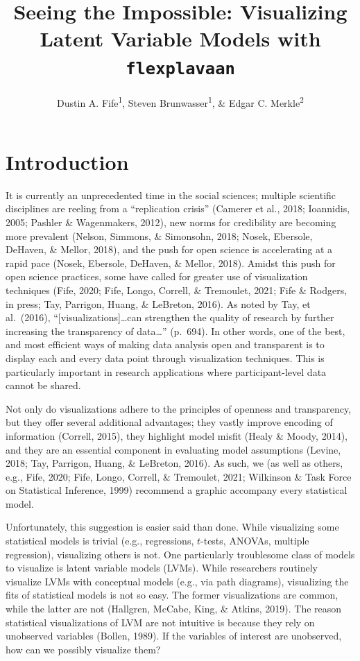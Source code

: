 \documentclass[
  english,
  man]{apa6}
\title{Seeing the Impossible: Visualizing Latent Variable Models with \texttt{flexplavaan}}
\author{Dustin A. Fife\textsuperscript{1}, Steven Brunwasser\textsuperscript{1}, \& Edgar C. Merkle\textsuperscript{2}}
\date{}
\affiliation{\vspace{0.5cm}\textsuperscript{1} Rowan University\\\textsuperscript{2} University of Missouri}
\begin{document}
\maketitle

\hypertarget{introduction}{%
\section{Introduction}\label{introduction}}

It is currently an unprecedented time in the social sciences; multiple scientific disciplines are reeling from a ``replication crisis'' (Camerer et al., 2018; Ioannidis, 2005; Pashler \& Wagenmakers, 2012), new norms for credibility are becoming more prevalent (Nelson, Simmons, \& Simonsohn, 2018; Nosek, Ebersole, DeHaven, \& Mellor, 2018), and the push for open science is accelerating at a rapid pace (Nosek, Ebersole, DeHaven, \& Mellor, 2018). Amidst this push for open science practices, some have called for greater use of visualization techniques (Fife, 2020; Fife, Longo, Correll, \& Tremoulet, 2021; Fife \& Rodgers, in press; Tay, Parrigon, Huang, \& LeBreton, 2016). As noted by Tay, et al.~(2016), ``{[}visualizations{]}\ldots can strengthen the quality of research by further increasing the transparency of data\ldots{}'' (p.~694). In other words, one of the best, and most efficient ways of making data analysis open and transparent is to display each and every data point through visualization techniques. This is particularly important in research applications where participant-level data cannot be shared.

Not only do visualizations adhere to the principles of openness and transparency, but they offer several additional advantages; they vastly improve encoding of information (Correll, 2015), they highlight model misfit (Healy \& Moody, 2014), and they are an essential component in evaluating model assumptions (Levine, 2018; Tay, Parrigon, Huang, \& LeBreton, 2016). As such, we (as well as others, e.g., Fife, 2020; Fife, Longo, Correll, \& Tremoulet, 2021; Wilkinson \& Task Force on Statistical Inference, 1999) recommend a graphic accompany every statistical model.

Unfortunately, this suggestion is easier said than done. While visualizing some statistical models is trivial (e.g., regressions, \(t\)-tests, ANOVAs, multiple regression), visualizing others is not. One particularly troublesome class of models to visualize is latent variable models (LVMs). While researchers routinely visualize LVMs with conceptual models (e.g., via path diagrams), visualizing the fits of statistical models is not so easy. The former visualizations are common, while the latter are not (Hallgren, McCabe, King, \& Atkins, 2019). The reason statistical visualizations of LVM are not intuitive is because they rely on unobserved variables (Bollen, 1989). If the variables of interest are unobserved, how can we possibly visualize them?
\end{document}
